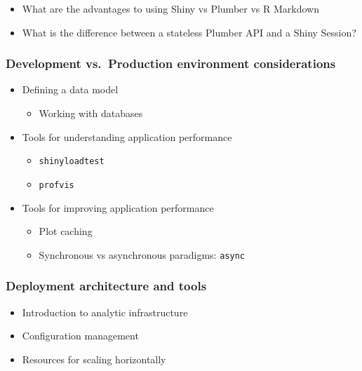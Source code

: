 \documentclass[]{book}
\providecommand{\tightlist}{%
  \setlength{\itemsep}{0pt}\setlength{\parskip}{0pt}}
\begin{document}
\begin{itemize}
\tightlist
\item
  What are the advantages to using Shiny vs Plumber vs R Markdown
\item
  What is the difference between a stateless Plumber API and a Shiny
  Session?
\end{itemize}

\hypertarget{development-vs.production-environment-considerations}{%
\subsubsection{Development vs.~Production environment
considerations}\label{development-vs.production-environment-considerations}}

\begin{itemize}
\tightlist
\item
  Defining a data model

  \begin{itemize}
  \tightlist
  \item
    Working with databases
  \end{itemize}
\item
  Tools for understanding application performance

  \begin{itemize}
  \tightlist
  \item
    \texttt{shinyloadtest}
  \item
    \texttt{profvis}
  \end{itemize}
\item
  Tools for improving application performance

  \begin{itemize}
  \tightlist
  \item
    Plot caching
  \item
    Synchronous vs asynchronous paradigms: \texttt{async}
  \end{itemize}
\end{itemize}

\hypertarget{deployment-architecture-and-tools}{%
\subsubsection{Deployment architecture and
tools}\label{deployment-architecture-and-tools}}

\begin{itemize}
\tightlist
\item
  Introduction to analytic infrastructure
\item
  Configuration management
\item
  Resources for scaling horizontally
\end{itemize}
\end{document}
